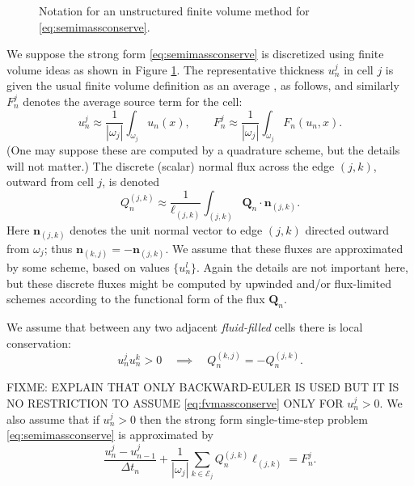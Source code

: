\documentclass[final,leqno,onefignum,onetabnum]{siamltex1213bueler}
\newcommand\bn{\mathbf{n}}
\newcommand\bQ{\mathbf{Q}}
\begin{document}
\begin{figure}[ht]
\begin{center}

\end{center}
\caption{Notation for an unstructured finite volume method for \eqref{eq:semimassconserve}.}
\label{fig:fvmesh-notation}
\end{figure}

We suppose the strong form \eqref{eq:semimassconserve} is discretized using finite volume ideas as shown in Figure \ref{fig:fvmesh-notation}.  The representative thickness $u_n^j$ in cell $j$ is given the usual finite volume definition as an average \cite{LeVeque2002}, as follows, and similarly $F_n^j$ denotes the average source term for the cell:
\begin{equation}
u_n^j \approx \frac{1}{|\omega_j|} \int_{\omega_j} u_n(x), \qquad F_n^j \approx \frac{1}{|\omega_j|} \int_{\omega_j} F_n(u_n,x).  \label{eq:fvthickness}
\end{equation}
(One may suppose these are computed by a quadrature scheme, but the details will not matter.)  The discrete (scalar) normal flux across the edge $(j,k)$, outward from cell $j$, is denoted
\begin{equation}
Q_n^{(j,k)} \approx \frac{1}{\ell_{(j,k)}} \int_{(j,k)} \bQ_n \cdot \bn_{(j,k)}. \label{eq:fvflux}
\end{equation}
Here $\bn_{(j,k)}$ denotes the unit normal vector to edge $(j,k)$ directed outward from $\omega_j$; thus $\bn_{(k,j)} = -\bn_{(j,k)}$.  We assume that these fluxes are approximated by some scheme, based on values $\{u_n^l\}$.  Again the details are not important here, but these discrete fluxes might be computed by upwinded and/or flux-limited schemes \cite{LeVeque2002} according to the functional form of the flux $\bQ_n$.

We assume that between any two adjacent \emph{fluid-filled} cells there is local conservation:
\begin{equation}
  u_n^j u_n^k > 0 \quad \implies \quad Q_n^{(k,j)}=-Q_n^{(j,k)}.  \label{eq:fvlocalconservation}
\end{equation}

FIXME: EXPLAIN THAT ONLY BACKWARD-EULER IS USED BUT IT IS NO RESTRICTION TO ASSUME \eqref{eq:fvmassconserve} ONLY FOR $u_n^j > 0$.  We also assume that if $u_n^j>0$ then the strong form single-time-step problem \eqref{eq:semimassconserve} is approximated by
\begin{equation}
\frac{u_n^j - u_{n-1}^j}{\Delta t_n} + \frac{1}{|\omega_j|} \sum_{k\in \mathcal{E}_j} Q_n^{(j,k)} \ell_{(j,k)} = F_n^j. \label{eq:fvmassconserve}
\end{equation}
\end{document}
